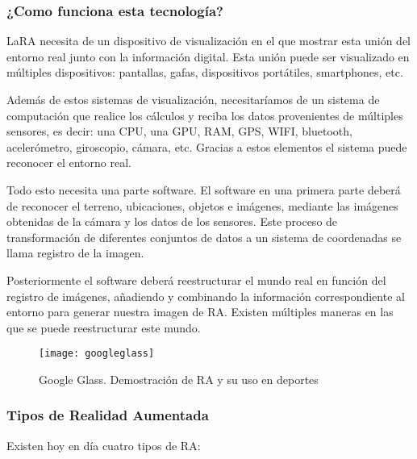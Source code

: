\subsubsection{¿Como funciona esta tecnología?}
LaRA necesita de un dispositivo de visualización en el que mostrar esta unión del entorno real junto con la información digital. Esta unión puede ser visualizado en múltiples dispositivos: pantallas, gafas, dispositivos portátiles, smartphones, etc.
 
Además de estos sistemas de visualización, necesitaríamos de un sistema de computación que realice los cálculos y reciba los datos provenientes de múltiples sensores, es decir: una CPU, una GPU, RAM, GPS, WIFI, bluetooth, acelerómetro, giroscopio, cámara, etc. Gracias a estos elementos el sistema puede reconocer el entorno real\cite{URL::ImageRegister}.

Todo esto necesita una parte software. El software en una primera parte deberá de reconocer el terreno, ubicaciones, objetos e imágenes, mediante las imágenes obtenidas de la cámara y los datos de los sensores. Este proceso de transformación de diferentes conjuntos de datos a un sistema de coordenadas se llama registro de la imagen. 

Posteriormente el software deberá reestructurar el mundo real en función del registro de imágenes, añadiendo y combinando la información correspondiente al entorno para generar nuestra imagen de RA. Existen múltiples maneras en las que se puede reestructurar este mundo. 

\begin{figure}[h]
	\centering
	\texttt{[image: googleglass]}
	\caption{Google Glass. Demostración de RA y su uso en deportes}
	\label{fig:googleglass}
\end{figure}

\subsubsection{Tipos de Realidad Aumentada}

Existen hoy en día cuatro tipos de RA:

